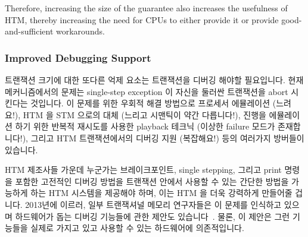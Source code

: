 Therefore, increasing the size of the guarantee also increases the
usefulness of HTM, thereby increasing the need for CPUs to either
provide it or provide good-and-sufficient workarounds.
\fi

\subsubsection{Improved Debugging Support}
\label{sec:future:Improved Debugging Support}

트랜잭션 크기에 대한 또다른 억제 요소는 트랜잭션을 디버깅 해야할 필요입니다.
현재 메커니즘에서의 문제는 single-step exception 이 자신을 둘러싼 트랜잭션을
abort 시킨다는 것입니다.
이 문제를 위한 우회적 해결 방법으로 프로세서 에뮬레이션 (느려요!), HTM 을 STM
으로의 대체 (느리고 시맨틱이 약간 다릅니다!), 진행을 에뮬레이션 하기 위한
반복적 재시도를 사용한 playback 테크닉 (이상한 failure 모드가 존재합니다!),
그리고 HTM 트랜잭션에서의 디버깅 지원 (복잡해요!) 등의 여러가지 방버들이
있습니다.

HTM 제조사들 가운데 누군가는 브레이크포인트, single stepping, 그리고 print
명령을 포함한 고전적인 디버깅 방법을 트랜잭션 안에서 사용할 수 있는 간단한
방법을 가능하게 하는 HTM 시스템을 제공해야 하며, 이는 HTM 을 더욱 강력하게
만들어줄 겁니다.
2013년에 이르러, 일부 트랜잭셔널 메모리 연구자들은 이 문제를 인식하고 있으며
하드웨어가 돕는 디버깅 기능들에 관한 제안도
있습니다~\cite{JustinGottschlich2013TMdebug}.
물론, 이 제안은 그런 기능들을 실제로 가지고 있고 사용할 수 있는 하드웨어에
의존적입니다.
\iffalse

Another inhibitor to transaction size is the need to debug the transactions.
The problem with current mechanisms is that a single-step exception
aborts the enclosing transaction.
There are a number of workarounds for this issue, including emulating
the processor (slow!), substituting STM for HTM (slow and slightly
different semantics!),
playback techniques using repeated retries to emulate forward
progress (strange failure modes!), and
full support of debugging HTM transactions (complex!).

Should one of the HTM vendors produce an HTM system that allows
straightforward use of classical debugging techniques within
transactions, including breakpoints, single stepping, and
print statements, this will make HTM much more compelling.
Some transactional-memory researchers are starting to recognize this
problem as of 2013, with at least one proposal involving hardware-assisted
debugging facilities~\cite{JustinGottschlich2013TMdebug}.
Of course, this proposal depends on readily available hardware gaining such
facilities.
\fi

